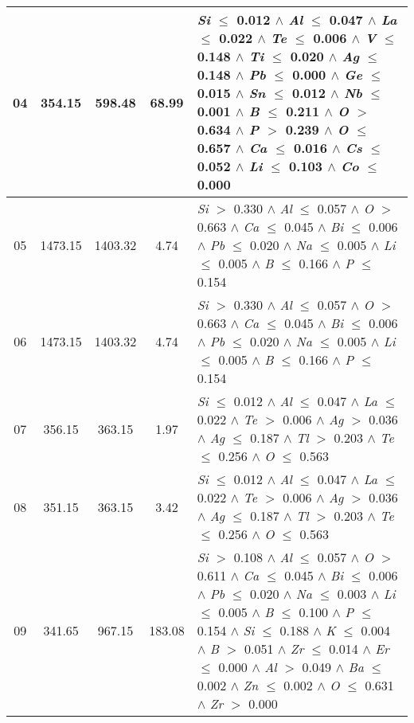 \begin{table}[!htbp]
\begin{tabular}{ccccm{}}
		\hline
		04 & 354.15 & 598.48 & 68.99 & \textit{Si} $\le$ 0.012 $\wedge$ \textit{Al} $\le$ 0.047 $\wedge$ \textit{La} $\le$ 0.022 $\wedge$ \textit{Te} $\le$ 0.006 $\wedge$ \textit{V} $\le$ 0.148 $\wedge$ \textit{Ti} $\le$ 0.020 $\wedge$ \textit{Ag} $\le$ 0.148 $\wedge$ \textit{Pb} $\le$ 0.000 $\wedge$ \textit{Ge} $\le$ 0.015 $\wedge$ \textit{Sn} $\le$ 0.012 $\wedge$ \textit{Nb} $\le$ 0.001 $\wedge$ \textit{B} $\le$ 0.211 $\wedge$ \textit{O} $>$ 0.634 $\wedge$ \textit{P} $>$ 0.239 $\wedge$ \textit{O} $\le$ 0.657 $\wedge$ \textit{Ca} $\le$ 0.016 $\wedge$ \textit{Cs} $\le$ 0.052 $\wedge$ \textit{Li} $\le$ 0.103 $\wedge$ \textit{Co} $\le$ 0.000\\
		\hline
		05 & 1473.15 & 1403.32 & 4.74 & \textit{Si} $>$ 0.330 $\wedge$ \textit{Al} $\le$ 0.057 $\wedge$ \textit{O} $>$ 0.663 $\wedge$ \textit{Ca} $\le$ 0.045 $\wedge$ \textit{Bi} $\le$ 0.006 $\wedge$ \textit{Pb} $\le$ 0.020 $\wedge$ \textit{Na} $\le$ 0.005 $\wedge$ \textit{Li} $\le$ 0.005 $\wedge$ \textit{B} $\le$ 0.166 $\wedge$ \textit{P} $\le$ 0.154\\
		\hline
		06 & 1473.15 & 1403.32 & 4.74 & \textit{Si} $>$ 0.330 $\wedge$ \textit{Al} $\le$ 0.057 $\wedge$ \textit{O} $>$ 0.663 $\wedge$ \textit{Ca} $\le$ 0.045 $\wedge$ \textit{Bi} $\le$ 0.006 $\wedge$ \textit{Pb} $\le$ 0.020 $\wedge$ \textit{Na} $\le$ 0.005 $\wedge$ \textit{Li} $\le$ 0.005 $\wedge$ \textit{B} $\le$ 0.166 $\wedge$ \textit{P} $\le$ 0.154\\
		\hline
		07 & 356.15 & 363.15 & 1.97 & \textit{Si} $\le$ 0.012 $\wedge$ \textit{Al} $\le$ 0.047 $\wedge$ \textit{La} $\le$ 0.022 $\wedge$ \textit{Te} $>$ 0.006 $\wedge$ \textit{Ag} $>$ 0.036 $\wedge$ \textit{Ag} $\le$ 0.187 $\wedge$ \textit{Tl} $>$ 0.203 $\wedge$ \textit{Te} $\le$ 0.256 $\wedge$ \textit{O} $\le$ 0.563\\
		\hline
		08 & 351.15 & 363.15 & 3.42 & \textit{Si} $\le$ 0.012 $\wedge$ \textit{Al} $\le$ 0.047 $\wedge$ \textit{La} $\le$ 0.022 $\wedge$ \textit{Te} $>$ 0.006 $\wedge$ \textit{Ag} $>$ 0.036 $\wedge$ \textit{Ag} $\le$ 0.187 $\wedge$ \textit{Tl} $>$ 0.203 $\wedge$ \textit{Te} $\le$ 0.256 $\wedge$ \textit{O} $\le$ 0.563\\
		\hline
		09 & 341.65 & 967.15 & 183.08 & \textit{Si} $>$ 0.108 $\wedge$ \textit{Al} $\le$ 0.057 $\wedge$ \textit{O} $>$ 0.611 $\wedge$ \textit{Ca} $\le$ 0.045 $\wedge$ \textit{Bi} $\le$ 0.006 $\wedge$ \textit{Pb} $\le$ 0.020 $\wedge$ \textit{Na} $\le$ 0.003 $\wedge$ \textit{Li} $\le$ 0.005 $\wedge$ \textit{B} $\le$ 0.100 $\wedge$ \textit{P} $\le$ 0.154 $\wedge$ \textit{Si} $\le$ 0.188 $\wedge$ \textit{K} $\le$ 0.004 $\wedge$ \textit{B} $>$ 0.051 $\wedge$ \textit{Zr} $\le$ 0.014 $\wedge$ \textit{Er} $\le$ 0.000 $\wedge$ \textit{Al} $>$ 0.049 $\wedge$ \textit{Ba} $\le$ 0.002 $\wedge$ \textit{Zn} $\le$ 0.002 $\wedge$ \textit{O} $\le$ 0.631 $\wedge$ \textit{Zr} $>$ 0.000\\

\end{tabular}
\end{table}
